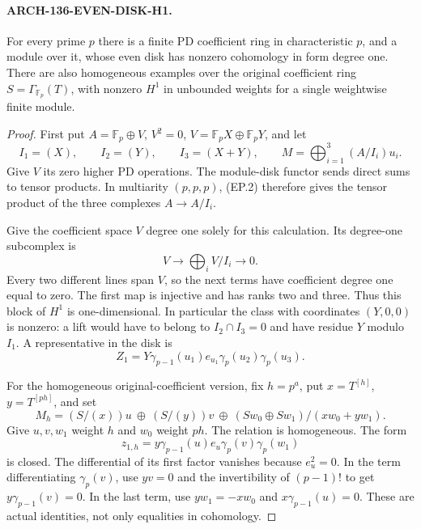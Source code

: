 \paragraph{ARCH-136-EVEN-DISK-H1.}
For every prime \(p\) there is a finite PD coefficient ring
in characteristic \(p\), and a module over it, whose even
disk has nonzero cohomology in form degree one. There are also
homogeneous examples over the original coefficient ring
\(S=\Gamma_{\mathbb F_p}(T)\), with nonzero \(H^1\)
in unbounded weights for a single weightwise finite module.

\begin{proof}
First put \(A=\mathbb F_p\oplus V\), \(V^2=0\),
\(V=\mathbb F_pX\oplus\mathbb F_pY\), and let
\[
 I_1=(X),\qquad I_2=(Y),\qquad I_3=(X+Y),\qquad
                 M=\bigoplus_{i=1}^3(A/I_i)u_i.          \tag{EP.4}
\]
Give \(V\) its zero higher PD operations. The module-disk
functor sends direct sums to tensor products. In multiarity
\((p,p,p)\), (EP.2) therefore gives the tensor product of
the three complexes \(A\to A/I_i\).

Give the coefficient space \(V\) degree one solely for
this calculation. Its degree-one subcomplex is
\[
                 V\longrightarrow\bigoplus_i V/I_i
                                      \longrightarrow0. \tag{EP.5}
\]
Every two different lines span \(V\), so the next terms
have coefficient degree one equal to zero. The first map is
injective and has ranks two and three. Thus this block of
\(H^1\) is one-dimensional. In particular the class with
coordinates \((Y,0,0)\) is nonzero: a lift would have to
belong to \(I_2\cap I_3=0\) and have residue \(Y\)
modulo \(I_1\). A representative in the disk is
\[
 Z_1=Y\gamma_{p-1}(u_1)e_{u_1}
                         \gamma_p(u_2)\gamma_p(u_3).    \tag{EP.6}
\]

For the homogeneous original-coefficient version, fix
\(h=p^a\), put \(x=T^{[h]}\), \(y=T^{[ph]}\), and set
\[
 M_h=(S/(x))u\ \oplus\ (S/(y))v\ \oplus\
       (S w_0\oplus S w_1)/(xw_0+yw_1).                 \tag{EP.7}
\]
Give \(u,v,w_1\) weight \(h\) and \(w_0\) weight
\(ph\). The relation is homogeneous. The form
\[
 z_{1,h}=y\gamma_{p-1}(u)e_u
                            \gamma_p(v)\gamma_p(w_1)    \tag{EP.8}
\]
is closed. The differential of its first factor vanishes
because \(e_u^2=0\). In the term differentiating
\(\gamma_p(v)\), use \(yv=0\) and the invertibility
of \((p-1)!\) to get \(y\gamma_{p-1}(v)=0\).
In the last term, use \(yw_1=-xw_0\) and
\(x\gamma_{p-1}(u)=0\). These are actual identities,
not only equalities in cohomology.


\end{proof}
